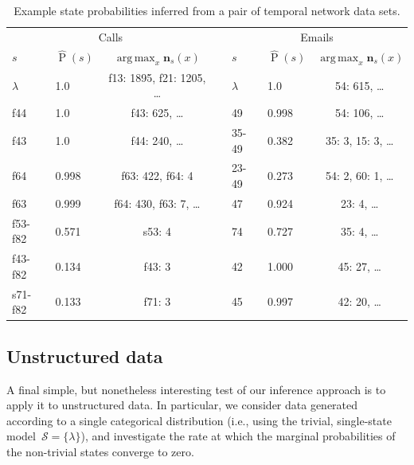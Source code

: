 \documentclass[11pt,a4paper]{article}
\newcommand\mc[1]{\mathcal{#1}}               %
\newcommand\ub[1]{\symbf{#1}}                 %
\DeclareMathOperator\Pb{P}                    %
\DeclareMathOperator*{\argmax}{arg\,max}
\begin{document}
\begin{table}[htbp]
\centering
\begin{tabular}{llccllc}
  \toprule
  \multicolumn{3}{c}{Calls} && \multicolumn{3}{c}{Emails} \\
  \cmidrule{1-3} \cmidrule{5-7}
  \(s\) & \(\hat{\Pb}(s)\) & \(\argmax_x \ub{n}_s(x)\) &&
  \(s\) & \(\hat{\Pb}(s)\) & \(\argmax_x \ub{n}_s(x)\) \\
  \midrule
  \(\lambda\) & 1.0   & f13: 1895, f21: 1205, \dots && \(\lambda\) & 1.0 & 54: 615, \dots \\
  f44         & 1.0   & f43: 625, \dots             && 49          & 0.998 & 54: 106, \dots \\
  f43         & 1.0   & f44: 240, \dots             && 35-49       & 0.382 & 35: 3, 15: 3, \dots \\
  f64         & 0.998 & f63: 422, f64: 4            && 23-49       & 0.273 & 54: 2, 60: 1, \dots \\
  f63         & 0.999 & f64: 430, f63: 7, \dots     && 47          & 0.924 & 23: 4, \dots \\
  f53-f82     & 0.571 & s53: 4                      && 74          & 0.727 & 35: 4, \dots \\
  f43-f82     & 0.134 & f43: 3                      && 42          & 1.000 & 45: 27, \dots \\
  s71-f82     & 0.133 & f71: 3                      && 45          & 0.997 & 42: 20, \dots \\
  \bottomrule
\end{tabular}
\caption{Example state probabilities inferred from a pair of temporal network
  data sets.}
\label{tab:network}
\end{table}


\subsection{Unstructured data}\label{sec:unstructured} %

A final simple, but nonetheless interesting test of our inference approach is to
apply it to unstructured data. In particular, we consider data generated
according to a single categorical distribution (i.e., using the trivial,
single-state model~\(\mc{S} = \{\lambda\}\)), and investigate the rate at which
the marginal probabilities of the non-trivial states converge to zero.
\end{document}
